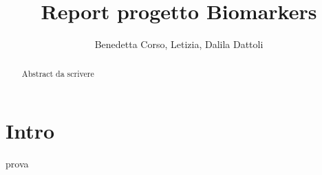 \documentclass[]{article}
\title{Report progetto Biomarkers}
\author{Benedetta Corso, Letizia, Dalila Dattoli}
\begin{document}
\maketitle

\begin{abstract}
Abstract da scrivere
\end{abstract}

\section{Intro}
prova
\end{document}
